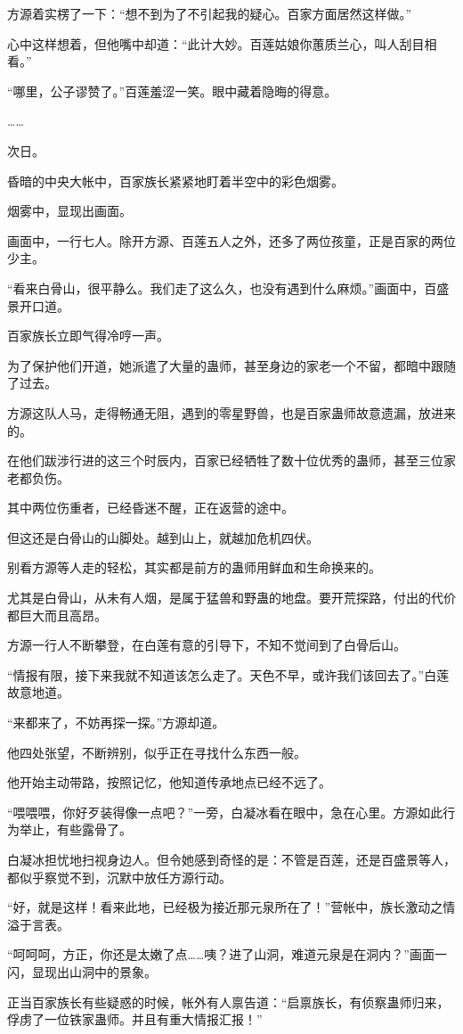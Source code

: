 \begin{this_body}
方源着实楞了一下：“想不到为了不引起我的疑心。百家方面居然这样做。”

心中这样想着，但他嘴中却道：“此计大妙。百莲姑娘你蕙质兰心，叫人刮目相看。”

“哪里，公子谬赞了。”百莲羞涩一笑。眼中藏着隐晦的得意。

……

次日。

昏暗的中央大帐中，百家族长紧紧地盯着半空中的彩色烟雾。

烟雾中，显现出画面。

画面中，一行七人。除开方源、百莲五人之外，还多了两位孩童，正是百家的两位少主。

“看来白骨山，很平静么。我们走了这么久，也没有遇到什么麻烦。”画面中，百盛景开口道。

百家族长立即气得冷哼一声。

为了保护他们开道，她派遣了大量的蛊师，甚至身边的家老一个不留，都暗中跟随了过去。

方源这队人马，走得畅通无阻，遇到的零星野兽，也是百家蛊师故意遗漏，放进来的。

在他们跋涉行进的这三个时辰内，百家已经牺牲了数十位优秀的蛊师，甚至三位家老都负伤。

其中两位伤重者，已经昏迷不醒，正在返营的途中。

但这还是白骨山的山脚处。越到山上，就越加危机四伏。

别看方源等人走的轻松，其实都是前方的蛊师用鲜血和生命换来的。

尤其是白骨山，从未有人烟，是属于猛兽和野蛊的地盘。要开荒探路，付出的代价都巨大而且高昂。

方源一行人不断攀登，在白莲有意的引导下，不知不觉间到了白骨后山。

“情报有限，接下来我就不知道该怎么走了。天色不早，或许我们该回去了。”白莲故意地道。

“来都来了，不妨再探一探。”方源却道。

他四处张望，不断辨别，似乎正在寻找什么东西一般。

他开始主动带路，按照记忆，他知道传承地点已经不远了。

“喂喂喂，你好歹装得像一点吧？”一旁，白凝冰看在眼中，急在心里。方源如此行为举止，有些露骨了。

白凝冰担忧地扫视身边人。但令她感到奇怪的是：不管是百莲，还是百盛景等人，都似乎察觉不到，沉默中放任方源行动。

“好，就是这样！看来此地，已经极为接近那元泉所在了！”营帐中，族长激动之情溢于言表。

“呵呵呵，方正，你还是太嫩了点……咦？进了山洞，难道元泉是在洞内？”画面一闪，显现出山洞中的景象。

正当百家族长有些疑惑的时候，帐外有人禀告道：“启禀族长，有侦察蛊师归来，俘虏了一位铁家蛊师。并且有重大情报汇报！”

\end{this_body}

